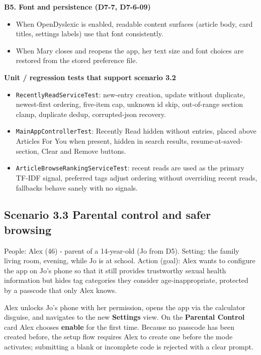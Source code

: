 \documentclass[a4paper, 12pt]{article}
\begin{document}
    \textbf{B5. Font and persistence (D7-7, D7-6-09)}

    \begin{itemize}
        \item When OpenDyslexic is enabled, readable content surfaces (article body,
            card titles, settings labels) use that font consistently.

        \item When Mary closes and reopens the app, her text size and font
            choices are restored from the stored preference file.
    \end{itemize}

    \textbf{Unit / regression tests that support scenario 3.2}

    \begin{itemize}
        \item \texttt{RecentlyReadServiceTest}: new-entry creation, update
            without duplicate, newest-first ordering, five-item cap, unknown id skip,
            out-of-range section clamp, duplicate dedup, corrupted-json recovery.

        \item \texttt{MainAppControllerTest}: Recently Read hidden without entries,
            placed above Articles For You when present, hidden in search results,
            resume-at-saved-section, Clear and Remove buttons.

        \item \texttt{ArticleBrowseRankingServiceTest}: recent reads are used as
            the primary TF-IDF signal, preferred tags adjust ordering without
            overriding recent reads, fallbacks behave sanely with no signals.
    \end{itemize}

    \subsection{Scenario 3.3 Parental control and safer browsing}

    People: Alex (46) - parent of a 14-year-old (Jo from D5). Setting: the
    family living room, evening, while Jo is at school. Action (goal): Alex
    wants to configure the app on Jo's phone so that it still provides
    trustworthy sexual health information but hides tag categories they consider
    age-inappropriate, protected by a passcode that only Alex knows.

    Alex unlocks Jo's phone with her permission, opens the app via the
    calculator disguise, and navigates to the new \textbf{Settings} view. On the
    \textbf{Parental Control} card Alex chooses \textbf{enable} for the first time.
    Because no passcode has been created before, the setup flow requires Alex to
    create one before the mode activates; submitting a blank or incomplete code
    is rejected with a clear prompt.
\end{document}
